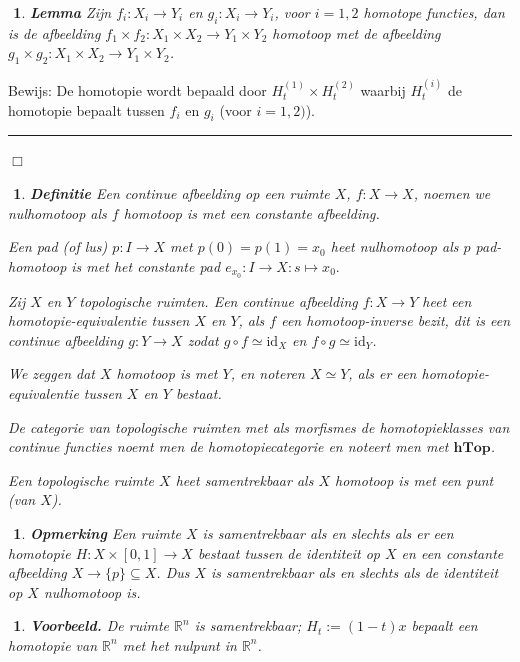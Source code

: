 \documentclass[12pt]{book}
\newcommand{\R}{\mathbb{R}}
\newcommand{\bew}{{\sc Bewijs: }}
\newcommand{\B}{\rule{1mm}{0mm} \hfill $\Box$ }
\newtheorem{eigh}[stelh]{$\!\!$}
\newenvironment{eig}{\begin{eigh}{\em {\bf Lemma }}}{\end{eigh}}
\newtheorem{vbh}[stelh]{$\!\!$}
\newenvironment{vb}{\begin{vbh} \em {\bf Voorbeeld.} }{\end{vbh}}
\newtheorem{opmh}[stelh]{$\!\!$}
\newtheorem{dfh}[stelh]{$\!\!$}
\newenvironment{eopm}{\begin{opmh} \em {\bf Opmerking }}{\end{opmh}}
\newenvironment{df}{\begin{dfh} \em {\bf Definitie }}{\end{dfh}}
\begin{document}
\begin{eig} Zijn $f_i: X_i\to Y_i$ en $g_i:X_i\to Y_i$, voor $i=1,2$ homotope functies, dan is de afbeelding $f_1\times f_2:X_1\times X_2 \to Y_1\times Y_2$ homotoop met de afbeelding $g_1\times g_2:X_1\times X_2 \to Y_1\times Y_2$.
\label{homotopprod}\end{eig}

\bew De homotopie wordt bepaald door $H_{t}^{(1)}\times H_{t}^{(2)}$ waarbij $H_{t}^{(i)}$ de homotopie bepaalt tussen $f_i$ en $g_i$ (voor $i=1,2)$). \B

\begin{df}\label{htop} Een continue afbeelding op een ruimte $X$, $f:X\to X$, noemen we {\em nulhomotoop} als $f$ homotoop is met een constante afbeelding. 

Een pad (of lus) $p:I\to X$ met $p(0)=p(1)=x_0$ heet {\em nulhomotoop} als $p$ pad-homotoop is met het constante pad $e_{x_{0}}:I \to X: s \mapsto x_0.$  

Zij $X$ en $Y$ topologische ruimten. 
Een continue afbeelding $f:X\to Y$ heet een  {\em homotopie-equivalentie} tussen  $X$  en $Y$, als $f$ een  {\em homotoop-inverse} bezit, dit is een continue afbeelding
$g:Y\to X$ zodat $g\circ f\simeq \mbox{id}_{X}$ en $f\circ g\simeq \mbox{id}_{Y}$.

We zeggen dat $X$  {\em homotoop} is met $Y$, en noteren $X\simeq Y$,
als er een homotopie-equivalentie tussen $X$ en $Y$ bestaat. 

De categorie van topologische ruimten met als morfismes de homotopieklasses van continue functies noemt men de \emph{homotopiecategorie} en noteert men met $\mathbf{hTop}$. 

Een topologische ruimte $X$ heet  {\em samentrekbaar} als $X$ homotoop is met een punt (van $X$).
\end{df} 
\begin{eopm}
Een ruimte $X$ is samentrekbaar als en slechts als er een homotopie $H:X\times [0,1]\to X$ bestaat tussen de identiteit op $X$ en een constante afbeelding $X\to \{p\}\subseteq X$.
Dus $X$ is samentrekbaar als en slechts als de identiteit op $X$ nulhomotoop is.
\end{eopm}

\begin{vb} De ruimte $\R^n$ is samentrekbaar; $H_t:=(1-t)x$ bepaalt een homotopie van $\R^n$ met het nulpunt in $\R^n$.

%
%
\end{vb}
\end{document}
